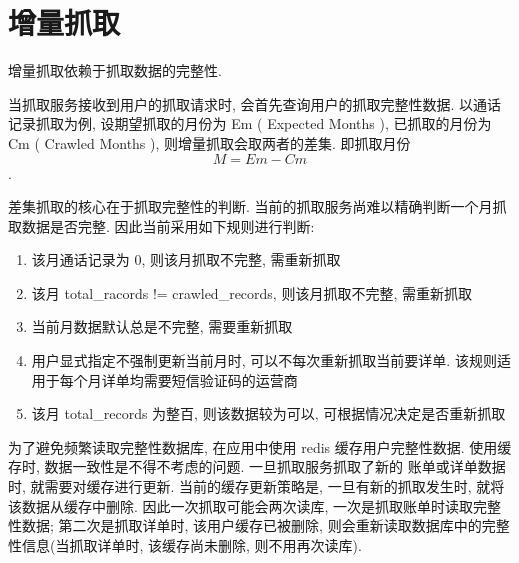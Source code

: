 \documentclass[UTF8]{ctexart}
\begin{document}
\section{增量抓取}
增量抓取依赖于抓取数据的完整性.

当抓取服务接收到用户的抓取请求时, 会首先查询用户的抓取完整性数据. 以通话记录抓取为例, 设期望抓取的月份为 Em ( Expected Months ),
已抓取的月份为 Cm ( Crawled Months ), 则增量抓取会取两者的差集. 即抓取月份 $$ M = Em - Cm $$.

差集抓取的核心在于抓取完整性的判断. 当前的抓取服务尚难以精确判断一个月抓取数据是否完整. 因此当前采用如下规则进行判断:
\begin{enumerate}
	\item 该月通话记录为 0, 则该月抓取不完整, 需重新抓取
	\item 该月 total_racords != crawled_records, 则该月抓取不完整, 需重新抓取
	\item 当前月数据默认总是不完整, 需要重新抓取
	\item 用户显式指定不强制更新当前月时, 可以不每次重新抓取当前要详单. 该规则适用于每个月详单均需要短信验证码的运营商
	\item 该月 total_records 为整百, 则该数据较为可以, 可根据情况决定是否重新抓取
\end{enumerate}

为了避免频繁读取完整性数据库, 在应用中使用 redis 缓存用户完整性数据. 使用缓存时, 数据一致性是不得不考虑的问题. 一旦抓取服务抓取了新的
账单或详单数据时, 就需要对缓存进行更新. 当前的缓存更新策略是, 一旦有新的抓取发生时, 就将该数据从缓存中删除. 因此一次抓取可能会两次读库,
一次是抓取账单时读取完整性数据; 第二次是抓取详单时, 该用户缓存已被删除, 则会重新读取数据库中的完整性信息(当抓取详单时, 该缓存尚未删除, 
则不用再次读库). 
\end{document}
